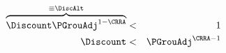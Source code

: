 \begin{eqnarray}
\overbrace{\Discount \PGrouAdj^{1-\CRRA} }^{\equiv \DiscAlt} & < & 1 \label{eq:FVAC}
\\ \Discount & < & \PGrouAdj^{\CRRA-1} \notag
\end{eqnarray}
